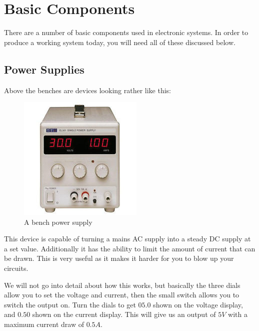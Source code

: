\section{Basic Components}
There are a number of basic components used in electronic systems.
In order to produce a working system today, you will need all of these discussed below.

\subsection{Power Supplies}
Above the benches are devices looking rather like this:

\begin{figure}[H]
	\centering
	\includegraphics[width=\textwidth]{./images/bench.jpg}
	\caption{A bench power supply}
	\label{fig:benchsupply}
\end{figure}

This device is capable of turning a mains AC supply into a steady DC supply at a set value.
Additionally it has the ability to limit the amount of current that can be drawn.
This is very useful as it makes it harder for you to blow up your circuits.

We will not go into detail about how this works, but basically the three dials allow you to set the voltage and current, then the small switch allows you to switch the output on.
Turn the dials to get $05.0$ shown on the voltage display, and $0.50$ shown on the current display.
This will give us an output of $5V$ with a maximum current draw of $0.5A$.

